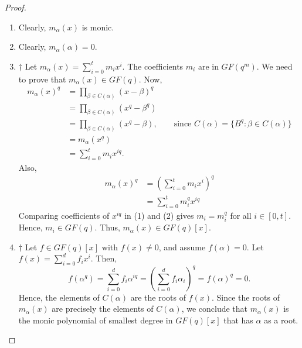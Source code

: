 \begin{proof}
    $ \; $

    \begin{enumerate}[label=(\roman*)]
        \item Clearly, $ m_\alpha(x) $ is monic.
        \item Clearly, $ m_\alpha(\alpha)=0 $.
        \item $ \dagger $ Let $ m_\alpha(x)=\sum\limits_{i=0}^{t} m_i x^i $.
              The coefficients $ m_i $ are in $ GF(q^m) $. We need to prove that
              $ m_\alpha(x)\in GF(q) $. Now,
              \begin{equation}
                  \begin{aligned}
                      m_\alpha(x)^q
                       & =\prod_{\beta\in C(\alpha)}(x-\beta)^q                                                          \\
                       & =\prod_{\beta\in C(\alpha)}(x^q-\beta^q)                                                        \\
                       & =\prod_{\beta\in C(\alpha)}(x^q-\beta),\qquad \text{since }C(\alpha)=\{B^q:\beta\in C(\alpha)\} \\
                       & =m_\alpha(x^q)                                                                                  \\
                       & =\sum\limits_{i=0}^{t} m_i x^{iq}.
                  \end{aligned}\tag{1}
              \end{equation}
              Also,
              \begin{equation}
                  \begin{aligned}
                      m_\alpha(x)^q
                       & =\left( \sum\limits_{i=0}^{t} m_i x^i \right)^q \\
                       & = \sum\limits_{i=0}^{t} m_i^q x^{iq}
                  \end{aligned}\tag{2}
              \end{equation}
              Comparing coefficients of $ x^{iq} $ in (1) and (2) gives $ m_i=m_i^q $
              for all $ i\in[0,t] $. Hence, $ m_i\in GF(q) $. Thus, $ m_\alpha(x)\in GF(q)[x] $.
        \item $ \dagger $ Let $ f\in GF(q)[x] $ with $ f(x)\neq 0 $, and assume $ f(\alpha)=0 $.
              Let $ f(x)=\sum\limits_{i=0}^{d} f_i x^i $. Then,
              \[ f(\alpha^q)=\sum\limits_{i=0}^{d} f_i\alpha^{iq}=
                  \left( \sum\limits_{i=0}^{d} f_i\alpha_i \right)^q=f(\alpha)^q=0. \]
              Hence, the elements of $ C(\alpha) $ are the roots of $ f(x) $. Since the roots
              of $ m_\alpha(x) $ are precisely the elements of $ C(\alpha) $, we conclude
              that $ m_\alpha(x) $ is the monic polynomial of smallest degree in $ GF(q)[x] $
              that has $ \alpha $ as a root.
    \end{enumerate}
\end{proof}

